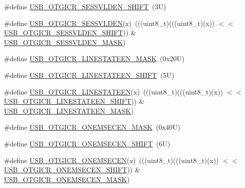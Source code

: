 \begin{DoxyCompactItemize}
\item 
\#define \mbox{\hyperlink{group___u_s_b___register___masks_ga6f1a0dd83404b56be4be006b113f68d8}{U\+S\+B\+\_\+\+O\+T\+G\+I\+C\+R\+\_\+\+S\+E\+S\+S\+V\+L\+D\+E\+N\+\_\+\+S\+H\+I\+FT}}~(3\+U)
\item 
\#define \mbox{\hyperlink{group___u_s_b___register___masks_gaefa67a953a6b7cc1ce8359265d288f3c}{U\+S\+B\+\_\+\+O\+T\+G\+I\+C\+R\+\_\+\+S\+E\+S\+S\+V\+L\+D\+EN}}(x)~(((uint8\+\_\+t)(((uint8\+\_\+t)(x)) $<$$<$ \mbox{\hyperlink{group___u_s_b___register___masks_ga6f1a0dd83404b56be4be006b113f68d8}{U\+S\+B\+\_\+\+O\+T\+G\+I\+C\+R\+\_\+\+S\+E\+S\+S\+V\+L\+D\+E\+N\+\_\+\+S\+H\+I\+FT}})) \& \mbox{\hyperlink{group___u_s_b___register___masks_ga35e32e6ed718719eb90a5aa7b8af10f3}{U\+S\+B\+\_\+\+O\+T\+G\+I\+C\+R\+\_\+\+S\+E\+S\+S\+V\+L\+D\+E\+N\+\_\+\+M\+A\+SK}})
\item 
\#define \mbox{\hyperlink{group___u_s_b___register___masks_gac9d12e9bdf0d60b52ea0b99c668630af}{U\+S\+B\+\_\+\+O\+T\+G\+I\+C\+R\+\_\+\+L\+I\+N\+E\+S\+T\+A\+T\+E\+E\+N\+\_\+\+M\+A\+SK}}~(0x20\+U)
\item 
\#define \mbox{\hyperlink{group___u_s_b___register___masks_ga1824eae0010a884c2b3bd425cfa2b389}{U\+S\+B\+\_\+\+O\+T\+G\+I\+C\+R\+\_\+\+L\+I\+N\+E\+S\+T\+A\+T\+E\+E\+N\+\_\+\+S\+H\+I\+FT}}~(5\+U)
\item 
\#define \mbox{\hyperlink{group___u_s_b___register___masks_gad0fdbf16d1db801b5c0d724fab29bdcf}{U\+S\+B\+\_\+\+O\+T\+G\+I\+C\+R\+\_\+\+L\+I\+N\+E\+S\+T\+A\+T\+E\+EN}}(x)~(((uint8\+\_\+t)(((uint8\+\_\+t)(x)) $<$$<$ \mbox{\hyperlink{group___u_s_b___register___masks_ga1824eae0010a884c2b3bd425cfa2b389}{U\+S\+B\+\_\+\+O\+T\+G\+I\+C\+R\+\_\+\+L\+I\+N\+E\+S\+T\+A\+T\+E\+E\+N\+\_\+\+S\+H\+I\+FT}})) \& \mbox{\hyperlink{group___u_s_b___register___masks_gac9d12e9bdf0d60b52ea0b99c668630af}{U\+S\+B\+\_\+\+O\+T\+G\+I\+C\+R\+\_\+\+L\+I\+N\+E\+S\+T\+A\+T\+E\+E\+N\+\_\+\+M\+A\+SK}})
\item 
\#define \mbox{\hyperlink{group___u_s_b___register___masks_gac68531fd32d53520e1d1ccdd4cfae9ec}{U\+S\+B\+\_\+\+O\+T\+G\+I\+C\+R\+\_\+\+O\+N\+E\+M\+S\+E\+C\+E\+N\+\_\+\+M\+A\+SK}}~(0x40\+U)
\item 
\#define \mbox{\hyperlink{group___u_s_b___register___masks_ga29ccacd7b79d6d2df3b8743ccd1c467f}{U\+S\+B\+\_\+\+O\+T\+G\+I\+C\+R\+\_\+\+O\+N\+E\+M\+S\+E\+C\+E\+N\+\_\+\+S\+H\+I\+FT}}~(6\+U)
\item 
\#define \mbox{\hyperlink{group___u_s_b___register___masks_gaa9d4e3dff8875d4766dcc81e91d46491}{U\+S\+B\+\_\+\+O\+T\+G\+I\+C\+R\+\_\+\+O\+N\+E\+M\+S\+E\+C\+EN}}(x)~(((uint8\+\_\+t)(((uint8\+\_\+t)(x)) $<$$<$ \mbox{\hyperlink{group___u_s_b___register___masks_ga29ccacd7b79d6d2df3b8743ccd1c467f}{U\+S\+B\+\_\+\+O\+T\+G\+I\+C\+R\+\_\+\+O\+N\+E\+M\+S\+E\+C\+E\+N\+\_\+\+S\+H\+I\+FT}})) \& \mbox{\hyperlink{group___u_s_b___register___masks_gac68531fd32d53520e1d1ccdd4cfae9ec}{U\+S\+B\+\_\+\+O\+T\+G\+I\+C\+R\+\_\+\+O\+N\+E\+M\+S\+E\+C\+E\+N\+\_\+\+M\+A\+SK}})
$$
\end{DoxyCompactItemize}
